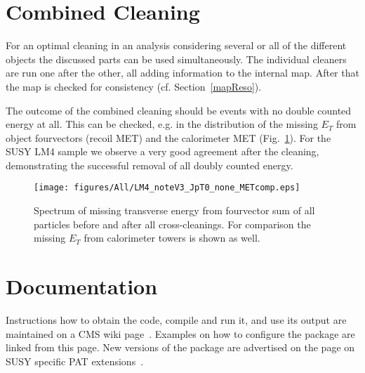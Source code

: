 \documentclass{cmspaper}
\begin{document}

\section{Combined Cleaning}
For an optimal cleaning in an analysis considering several or all of the
different objects the discussed parts can be used simultaneously. The individual
cleaners are run one after the other, all adding information to the internal
map. After that the map is checked for consistency (cf. Section~\ref{mapReso}).

The outcome of the combined cleaning should be events with no double counted
energy at all. This can be checked, e.g. in the distribution of the
missing $E_T$ from object fourvectors (recoil MET) and the calorimeter MET
(Fig.~\ref{fig:allMET}). For the SUSY LM4 sample we observe a very good
agreement after the cleaning, demonstrating the successful removal of all doubly
counted energy.

\begin{figure}[hb]
\begin{center}
    \texttt{[image: figures/All/LM4\_noteV3\_JpT0\_none\_METcomp.eps]}
    \caption{Spectrum of missing transverse energy from fourvector sum of all
    particles before and after all cross-cleanings. For comparison
    the missing $E_T$ from calorimeter towers is shown as well.}
\label{fig:allMET}
\end{center}
\end{figure}

\clearpage


\section{Documentation}
Instructions how to obtain the code, compile and run it, and use its
output are maintained on a CMS wiki page~\cite{twiki}. Examples on how to
configure the package are linked from this page. New versions of the package
are advertised on the page on SUSY specific PAT extensions~\cite{susypat}.
\end{document}
